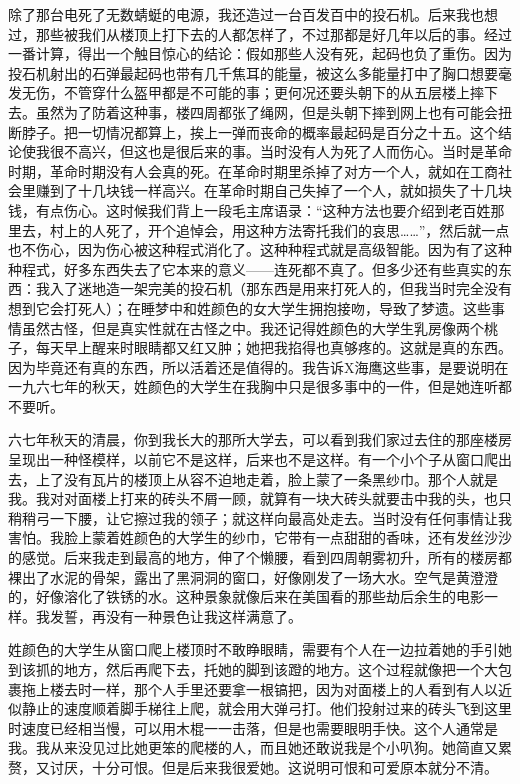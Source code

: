 除了那台电死了无数蜻蜓的电源，我还造过一台百发百中的投石机。后来我也想过，那些被我们从楼顶上打下去的人都怎样了，不过那都是好几年以后的事。经过一番计算，得出一个触目惊心的结论：假如那些人没有死，起码也负了重伤。因为投石机射出的石弹最起码也带有几千焦耳的能量，被这么多能量打中了胸口想要毫发无伤，不管穿什么盔甲都是不可能的事；更何况还要头朝下的从五层楼上摔下去。虽然为了防着这种事，楼四周都张了绳网，但是头朝下摔到网上也有可能会扭断脖子。把一切情况都算上，挨上一弹而丧命的概率最起码是百分之十五。这个结论使我很不高兴，但这也是很后来的事。当时没有人为死了人而伤心。当时是革命时期，革命时期没有人会真的死。在革命时期里杀掉了对方一个人，就如在工商社会里赚到了十几块钱一样高兴。在革命时期自己失掉了一个人，就如损失了十几块钱，有点伤心。这时候我们背上一段毛主席语录：“这种方法也要介绍到老百姓那里去，村上的人死了，开个追悼会，用这种方法寄托我们的哀思……”，然后就一点也不伤心，因为伤心被这种程式消化了。这种种程式就是高级智能。因为有了这种种程式，好多东西失去了它本来的意义——连死都不真了。但多少还有些真实的东西：我入了迷地造一架完美的投石机（那东西是用来打死人的，但我当时完全没有想到它会打死人）；在睡梦中和姓颜色的女大学生拥抱接吻，导致了梦遗。这些事情虽然古怪，但是真实性就在古怪之中。我还记得姓颜色的大学生乳房像两个桃子，每天早上醒来时眼睛都又红又肿；她把我掐得也真够疼的。这就是真的东西。因为毕竟还有真的东西，所以活着还是值得的。我告诉X海鹰这些事，是要说明在一九六七年的秋天，姓颜色的大学生在我胸中只是很多事中的一件，但是她连听都不要听。 

六七年秋天的清晨，你到我长大的那所大学去，可以看到我们家过去住的那座楼房呈现出一种怪模样，以前它不是这样，后来也不是这样。有一个小个子从窗口爬出去，上了没有瓦片的楼顶上从容不迫地走着，脸上蒙了一条黑纱巾。那个人就是我。我对对面楼上打来的砖头不屑一顾，就算有一块大砖头就要击中我的头，也只稍稍弓一下腰，让它擦过我的领子；就这样向最高处走去。当时没有任何事情让我害怕。我脸上蒙着姓颜色的大学生的纱巾，它带有一点甜甜的香味，还有发丝沙沙的感觉。后来我走到最高的地方，伸了个懒腰，看到四周朝雾初升，所有的楼房都裸出了水泥的骨架，露出了黑洞洞的窗口，好像刚发了一场大水。空气是黄澄澄的，好像溶化了铁锈的水。这种景象就像后来在美国看的那些劫后余生的电影一样。我发誓，再没有一种景色让我这样满意了。 

姓颜色的大学生从窗口爬上楼顶时不敢睁眼睛，需要有个人在一边拉着她的手引她到该抓的地方，然后再爬下去，托她的脚到该蹬的地方。这个过程就像把一个大包裹拖上楼去时一样，那个人手里还要拿一根镐把，因为对面楼上的人看到有人以近似静止的速度顺着脚手梯往上爬，就会用大弹弓打。他们投射过来的砖头飞到这里时速度已经相当慢，可以用木棍一一击落，但是也需要眼明手快。这个人通常是我。我从来没见过比她更笨的爬楼的人，而且她还敢说我是个小叭狗。她简直又累赘，又讨厌，十分可恨。但是后来我很爱她。这说明可恨和可爱原本就分不清。 

